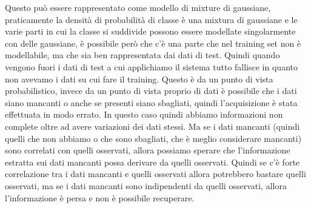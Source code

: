 \noindent Questo può essere rappresentato come modello di mixture di gaussiane, praticamente la densità di probabilità di classe è una mixtura di gaussiane e le varie parti in cui la classe si suddivide possono essere modellate singolarmente con delle gaussiane, è possibile però che c'è una parte che nel training set non è modellabile, ma che sia ben rappresentata dai dati di test. Quindi quando vengono fuori i dati di test a cui applichiamo il sistema tutto fallisce in quanto non avevamo i dati su cui fare il training. Questo è da un punto di vista probabilistico, invece da un punto di vista proprio di dati è possibile che i dati siano mancanti o anche se presenti siano sbagliati, quindi l'acquisizione è stata effettuata in modo errato. In questo caso quindi abbiamo informazioni  non complete oltre ad avere variazioni dei dati stessi.  Ma se i dati mancanti (quindi quelli che non abbiamo o che sono sbagliati, che è meglio considerare mancanti) sono correlati con quelli osservati, allora possiamo sperare che l'informazione estratta sui dati mancanti possa  derivare da quelli osservati. Quindi se c'è forte correlazione tra i dati mancanti e quelli osservati allora potrebbero bastare quelli osservati, ma se i dati mancanti sono indipendenti da quelli osservati, allora l'informazione è persa e non è possibile recuperare.\\


